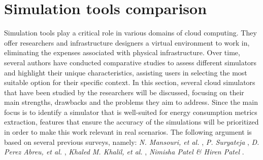 \section{Simulation tools comparison} { 
Simulation tools play a critical role in various domains of cloud computing. They offer researchers and infrastructure designers a virtual environment to work in, eliminating the expenses associated with physical infrastructure. Over time, several authors have conducted comparative studies to assess different simulators and highlight their unique characteristics, assisting users in selecting the most suitable option for their specific context. In this section, several cloud simulators that have been studied by the researchers will be discussed, focusing on their main strengths, drawbacks and the problems they aim to address. Since the main focus is to identify a simulator that is well-suited for energy consumption metrics extraction, features that ensure the accuracy of the simulations will be prioritized in order to make this work relevant in real scenarios. The following argument is based on several previous surveys, namely: \emph{N. Mansouri, et al.} \cite{mansouri2020cloud}, \emph{P. Suryateja} \cite{suryateja2016comparative}, \emph{D. Perez Abreu, et al.} \cite{abreu2020comparative}, \emph{Khaled M. Khalil, et al.} \cite{khalil2017cloud}, \emph{Nimisha Patel
\& Hiren Patel} \cite{patel2016comprehensive}.
 
}
